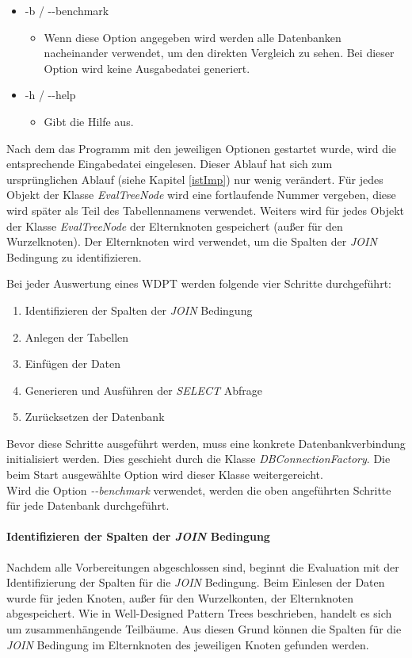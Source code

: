 \documentclass[draft,final]{vutinfth} %
\begin{document}
\begin{itemize}
\begin{itemize}
	\end{itemize} 
	\item -b / -{}-benchmark
	\begin{itemize}
		\item Wenn diese Option angegeben wird werden alle Datenbanken nacheinander verwendet, um den direkten Vergleich zu sehen. Bei dieser Option wird keine Ausgabedatei generiert.
	\end{itemize}  
	\item -h / -{}-help
	\begin{itemize}
		\item Gibt die Hilfe aus.
	\end{itemize} 
\end{itemize}

Nach dem das Programm mit den jeweiligen Optionen gestartet wurde, wird die entsprechende Eingabedatei eingelesen. Dieser Ablauf hat sich zum ursprünglichen Ablauf (siehe Kapitel \ref{istImp}) nur wenig verändert. Für jedes Objekt der Klasse \textit{EvalTreeNode} wird eine fortlaufende Nummer vergeben, diese wird später als Teil des Tabellennamens verwendet. Weiters wird für jedes Objekt der Klasse \textit{EvalTreeNode} der Elternknoten gespeichert (au\ss er für den Wurzelknoten). Der Elternknoten wird verwendet, um die Spalten der \textit{JOIN} Bedingung zu identifizieren.

Bei jeder Auswertung eines WDPT werden folgende vier Schritte durchgeführt:

\begin{enumerate}
	\item Identifizieren der Spalten der \textit{JOIN} Bedingung
	\item Anlegen der Tabellen
	\item Einfügen der Daten
	\item Generieren und Ausführen der \textit{SELECT} Abfrage
	\item Zurücksetzen der Datenbank
\end{enumerate}

Bevor diese Schritte ausgeführt werden, muss eine konkrete Datenbankverbindung initialisiert werden. Dies geschieht durch die Klasse \textit{DBConnectionFactory}. Die beim Start ausgewählte Option wird dieser Klasse weitergereicht. \\
Wird die Option \textit{-{}-benchmark} verwendet, werden die oben angeführten Schritte für jede Datenbank durchgeführt. 


\paragraph{Identifizieren der Spalten der \textit{JOIN} Bedingung} \label{joinCols}
Nachdem alle Vorbereitungen abgeschlossen sind, beginnt die Evaluation mit der Identifizierung der Spalten für die \textit{JOIN} Bedingung. Beim Einlesen der Daten wurde für jeden Knoten, au\ss er für den Wurzelkonten, der Elternknoten abgespeichert. Wie in Well-Designed Pattern Trees \cite{OptMat} beschrieben, handelt es sich um zusammenhängende Teilbäume. Aus diesen Grund können die Spalten für die \textit{JOIN} Bedingung im Elternknoten des jeweiligen Knoten gefunden werden. 
\end{document}
